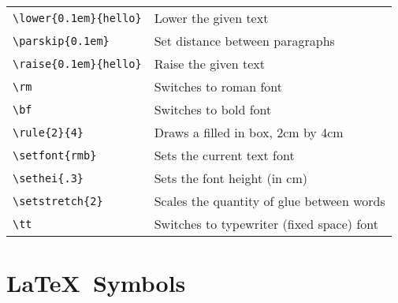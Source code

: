 \begin{tabular}{ll}
\verb+\lower{0.1em}{hello}+ & Lower the given text \\
\verb+\parskip{0.1em}+      & Set distance between paragraphs \\
\verb+\raise{0.1em}{hello}+ & Raise the given text \\
\verb+\rm+                  & Switches to roman font \\
\verb+\bf+                  & Switches to bold font \\
\verb+\rule{2}{4}+          & Draws a filled in box, 2cm by 4cm \\
\verb+\setfont{rmb}+        & Sets the current text font \\
\verb+\sethei{.3}+          & Sets the font height (in cm) \\
\verb+\setstretch{2}+       & Scales the quantity of glue between words \\
\verb+\tt+                  & Switches to typewriter (fixed space) font \\
\end{tabular}

\newpage
\section{\LaTeX\ Symbols}

\mbox{}
